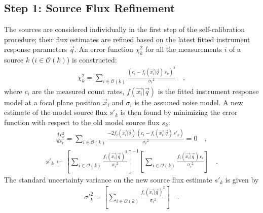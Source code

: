 \documentclass[manuscript]{aastex}
\begin{document}
\subsection{Step 1: Source Flux Refinement}
The sources are considered individually in the first step of the self-calibration procedure; their flux estimates are refined based on the latest fitted instrument response parameters $\vec{q}$. An error function $\chi^2_{k}$ for all the measurements $i$ of a source $k$ ($i \in \mathcal{O}(k)$) is constructed:
\begin{eqnarray*}
\chi^2_{k} = \sum_{i \in \mathcal{O}(k)} \frac{(c_i-f_{i}(\vec{x_i} | \vec{q}) \, s_{k})^2}{{\sigma_i}^2} \quad ,
\end{eqnarray*}
where $c_i$ are the measured count rates, $f(\vec{x_i} | \vec{q})$ is the fitted instrument response model at a focal plane position $\vec{x}_i$ and $\sigma_i$ is the assumed noise model. A new estimate of the model source flux $s'_{k}$ is then found by minimizing the error function with respect to the old model source flux $s_{k}$:
\begin{eqnarray*}
\frac{d\chi^2_{k}}{d s_{k}} = \sum_{i \in \mathcal{O}(k)} \frac{-2 f_{i}(\vec{x_i} | \vec{q}) \, (c_i-f_{i}(\vec{x_i} | \vec{q}) \, s'_{k})}{{\sigma_i}^2} = 0 \quad ,
\end{eqnarray*}
\begin{eqnarray*}
s'_{k} \leftarrow \left[{\sum_{i \in \mathcal{O}(k)}  \frac{f_{i}(\vec{x_i} | \vec{q})^2}{{\sigma_i}^2}} \right]^{-1}  \left[ {\sum_{i \in \mathcal{O}(k)} \frac{f_{i}(\vec{x_i} | \vec{q}) \, c_i}{{\sigma_i}^2}} \right] \quad .
\end{eqnarray*}
The standard uncertainty variance on the new source flux estimate $s'_{k}$ is given by
\begin{eqnarray*}
\sigma'^2_k = \left[{\sum_{i \in \mathcal{O}(k)}  \frac{f_{i}(\vec{x_i} | \vec{q})^2}{{\sigma_i}^2}} \right] \quad .
\end{eqnarray*}
\end{document}

